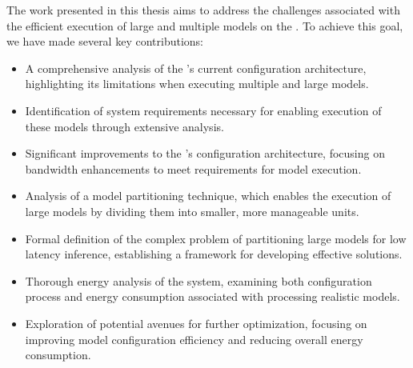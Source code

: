 The work presented in this thesis aims to address the challenges associated with the efficient execution of large and multiple models on the \graicore{}.
To achieve this goal, we have made several key contributions:
\begin{itemize}
    \item 
    A comprehensive analysis of the \graicore{}'s current configuration architecture, highlighting its limitations when executing multiple and large models.
    \item
    Identification of system requirements necessary for enabling execution of these models through extensive analysis.
    \item
    Significant improvements to the \graicore{}'s configuration architecture, focusing on bandwidth enhancements to meet requirements for model execution.
    \item
    Analysis of a model partitioning technique, which enables the execution of large models by dividing them into smaller, more manageable units.
    \item
    Formal definition of the complex problem of partitioning large models for low latency inference, establishing a framework for developing effective solutions.
    \item
    Thorough energy analysis of the system, examining both configuration process and energy consumption associated with processing realistic models.
    \item
    Exploration of potential avenues for further optimization, focusing on improving model configuration efficiency and reducing overall energy consumption.
\end{itemize}